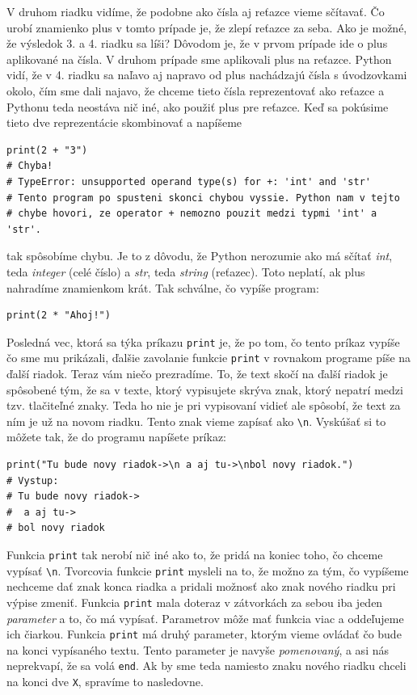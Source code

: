 V druhom riadku vidíme, že podobne ako čísla aj reťazce vieme sčítavať. Čo urobí znamienko plus v tomto prípade je, že zlepí reťazce za seba. Ako je možné, že výsledok 3. a 4. riadku sa líši? Dôvodom je, že v prvom prípade ide o plus aplikované na čísla. V druhom prípade sme aplikovali plus na reťazce. Python vidí, že v 4. riadku sa naľavo aj napravo od plus nachádzajú čísla s úvodzovkami okolo, čím sme dali najavo, že chceme tieto čísla reprezentovať ako reťazce a Pythonu teda neostáva nič iné, ako použiť plus pre reťazce. Keď sa pokúsime tieto dve reprezentácie skombinovať a 
napíšeme

\begin{lstlisting}
print(2 + "3")
# Chyba! 
# TypeError: unsupported operand type(s) for +: 'int' and 'str'
# Tento program po spusteni skonci chybou vyssie. Python nam v tejto
# chybe hovori, ze operator + nemozno pouzit medzi typmi 'int' a 'str'.
\end{lstlisting}

tak spôsobíme chybu. Je to z dôvodu, že Python nerozumie ako má sčítať \textit{int}, teda \textit{integer} (celé číslo) a \textit{str}, teda \textit{string} (reťazec). Toto neplatí, ak plus nahradíme znamienkom krát. Tak schválne, čo vypíše program:

\begin{lstlisting}
print(2 * "Ahoj!")
\end{lstlisting}

Posledná vec, ktorá sa týka príkazu \texttt{print} je, že po tom, čo tento príkaz vypíše čo sme mu prikázali, ďalšie zavolanie funkcie \texttt{print} v rovnakom programe píše na ďalší riadok. Teraz vám niečo prezradíme. To, že text skočí na ďalší riadok je spôsobené tým, že sa v texte, ktorý vypisujete skrýva znak, ktorý nepatrí medzi tzv. tlačiteľné znaky. Teda ho nie je pri vypisovaní vidieť ale spôsobí, že text za ním je už na novom riadku. Tento znak vieme zapísať ako \texttt{\textbackslash n}. Vyskúšať si to môžete tak, že do programu napíšete príkaz:

\begin{lstlisting}
print("Tu bude novy riadok->\n a aj tu->\nbol novy riadok.")
# Vystup:
# Tu bude novy riadok->
#  a aj tu->
# bol novy riadok
\end{lstlisting}

Funkcia \texttt{print} tak nerobí nič iné ako to, že pridá na koniec toho, čo chceme vypísať \texttt{\textbackslash n}. Tvorcovia funkcie \texttt{print} mysleli na to, že možno za tým, čo vypíšeme nechceme dať znak konca riadka a pridali možnosť ako znak nového riadku pri výpise zmeniť. Funkcia \texttt{print} mala doteraz v zátvorkách za sebou iba jeden \textit{parameter} a to, čo má vypísať. Parametrov môže mať funkcia viac a oddeľujeme ich čiarkou. Funkcia \texttt{print} má druhý parameter, ktorým vieme ovládať čo bude na konci vypísaného textu. Tento parameter je navyše \textit{pomenovaný}, a asi nás neprekvapí, že sa volá \texttt{end}. Ak by sme teda namiesto znaku nového riadku chceli na konci dve \texttt{X}, spravíme to nasledovne.

